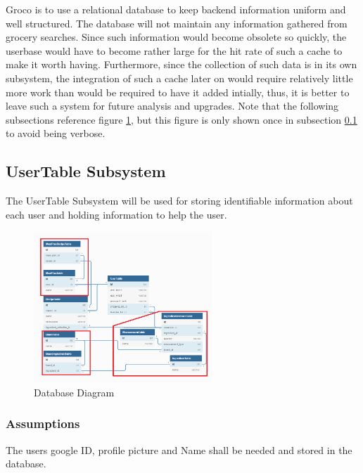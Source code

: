 Groco is to use a relational database to keep backend information uniform and well structured.  The database will not maintain any information gathered from grocery searches.  Since such information would become obsolete so quickly, the userbase would have to become rather large for the hit rate of such a cache to make it worth having.  Furthermore, since the collection of such data is in its own subsystem, the integration of such a cache later on would require relatively little more work than would be required to have it added intially, thus, it is better to leave such a system for future analysis and upgrades.  Note that the following subsections reference figure \ref{fig:db.1}, but this figure is only shown once in subsection \ref{section:db.1} to avoid being verbose.


\subsection{UserTable Subsystem}\label{section:db.1}
The UserTable Subsystem will be used for storing identifiable information about each user and holding information to help the user.

\begin{figure}[h!]\label{fig:db.1}
	\centering
 	\includegraphics[width=0.60\textwidth]{images/Database}
 \caption{Database Diagram}
\end{figure}

\subsubsection{Assumptions}
The users google ID, profile picture and Name shall be needed and stored in the database.

